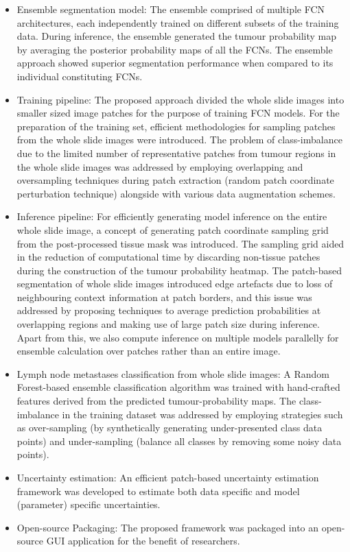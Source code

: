 \documentclass[times,twocolumn,final,authoryear]{tmp}
\begin{document}
\begin{itemize}
	\item Ensemble segmentation model: The ensemble comprised of multiple FCN architectures, each independently trained on different subsets of the training data. During inference, the ensemble generated the tumour probability map by averaging the posterior probability maps of all the FCNs. The ensemble approach showed superior segmentation performance when compared to its individual constituting FCNs.   


	\item Training pipeline: The proposed approach divided the whole slide images into smaller sized image patches for the purpose of training FCN models. For the preparation of the training set, efficient methodologies for sampling patches from the whole slide images were introduced. The problem of class-imbalance due to the limited number of representative patches from tumour regions in the whole slide images was addressed by employing overlapping and oversampling techniques during patch extraction (random patch coordinate perturbation technique) alongside with various data augmentation schemes.

	\item Inference pipeline: For efficiently generating model inference on the entire whole slide image, a concept of generating patch coordinate sampling grid from the post-processed tissue mask was introduced. The sampling grid aided in the reduction of computational time by discarding non-tissue patches during the construction of the tumour probability heatmap. The patch-based segmentation of whole slide images introduced edge artefacts due to loss of neighbouring context information at patch borders, and this issue was addressed by proposing techniques to average prediction probabilities at overlapping regions and making use of large patch size during inference. Apart from this, we also compute inference on multiple models parallelly for ensemble calculation over patches rather than an entire image.

	\item Lymph node metastases classification from whole slide images: A Random Forest-based ensemble classification algorithm was trained with hand-crafted features derived from the predicted tumour-probability maps. The class-imbalance in the training dataset was addressed by employing strategies such as over-sampling (by synthetically generating under-presented class data points) and under-sampling (balance all classes by removing some noisy data points).







    \item Uncertainty estimation: An efficient patch-based uncertainty estimation framework was developed to estimate both data specific and model (parameter) specific uncertainties.

    \item Open-source Packaging:  The proposed framework was packaged into an open-source GUI application for the benefit of researchers.
   
\end{itemize}
\end{document}
